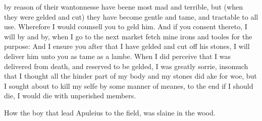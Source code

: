 by reason of their wantonnesse have beene most mad and terrible, but (when they
were gelded and cut) they have become gentle and tame, and tractable to all
use. Wherefore I would counsell you to geld him. And if you consent thereto, I
will by and by, when I go to the next market fetch mine irons and tooles for
the purpose: And I ensure you after that I have gelded and cut off his stones,
I will deliver him unto you as tame as a lambe. When I did perceive that I was
delivered from death, and reserved to be gelded, I was greatly sorrie, insomuch
that I thought all the hinder part of my body and my stones did ake for woe,
but I sought about to kill my selfe by some manner of meanes, to the end if I
should die, I would die with unperished members.


How the boy that lead Apuleius to the field, was slaine in the wood.

